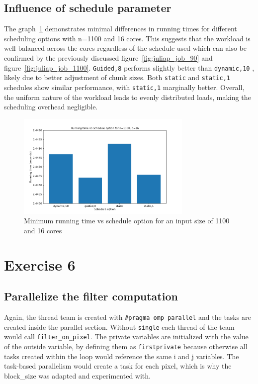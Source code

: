 \documentclass[a4paper,%
7pt,%
DIV12,
headsepline,%
headings=normal,
]{scrartcl}
\begin{document}
\subsection{Influence of schedule parameter}

The graph~\ref{fig:juliap2_job} demonstrates minimal differences in running times for different scheduling options with n=1100 and 16 cores. This suggests that the workload is well-balanced across the cores regardless of the schedule used which can also be confirmed by the previously discussed figure~\ref{fig:juliap_job_90} and figure~\ref{fig:juliap_job_1100}.  \texttt{Guided,8} performs slightly better than \texttt{dynamic,10} , likely due to better adjustment of chunk sizes. Both \texttt{static} and \texttt{static,1} schedules show similar performance, with \texttt{static,1} marginally better. Overall, the uniform nature of the workload leads to evenly distributed loads, making the scheduling overhead negligible.

\begin{figure}[htbp]
    \centering
    \includegraphics[width=0.75\textwidth]{./assets/juliap2_job.png}
    \caption{Minimum running time vs schedule option for an input size of 1100 and 16 cores}
    \label{fig:juliap2_job}
\end{figure}


\section{Exercise 6}

\subsection{Parallelize the filter computation}

Again, the thread team is created with \texttt{\#pragma omp parallel} and the tasks are created inside the parallel section. Without \texttt{single} each thread of the team would call \texttt{filter\_on\_pixel}. 
The private variables are initialized with the value of the outside variable, by defining them as \texttt{firstprivate} because otherwise all tasks created within the loop would reference the same i and j variables. The task-based parallelism would create a task for each pixel, which is why the block\_size was adapted and experimented with.
\end{document}
